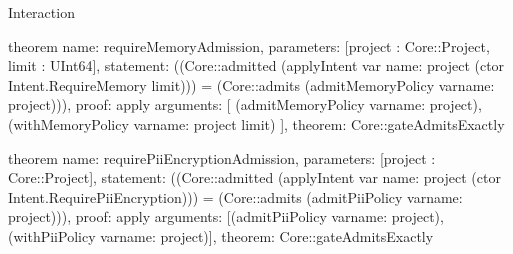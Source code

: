 \begin{lexlean}{Interaction}
\begin{semanticmodule}
theorem{
  name: requireMemoryAdmission,
  parameters: [project : Core::Project, limit : UInt64],
  statement: ((Core::admitted (applyIntent var{
    name: project
  } (ctor Intent.RequireMemory limit))) = (Core::admits (admitMemoryPolicy var{name: project}))),
  proof: apply{
    arguments: [
      (admitMemoryPolicy var{name: project}),
      (withMemoryPolicy var{name: project} limit)
    ],
    theorem: Core::gateAdmitsExactly
  }
}

theorem{
  name: requirePiiEncryptionAdmission,
  parameters: [project : Core::Project],
  statement: ((Core::admitted (applyIntent var{
    name: project
  } (ctor Intent.RequirePiiEncryption))) = (Core::admits (admitPiiPolicy var{name: project}))),
  proof: apply{
    arguments: [(admitPiiPolicy var{name: project}), (withPiiPolicy var{name: project})],
    theorem: Core::gateAdmitsExactly
  }
}
\end{semanticmodule}
\end{lexlean}
